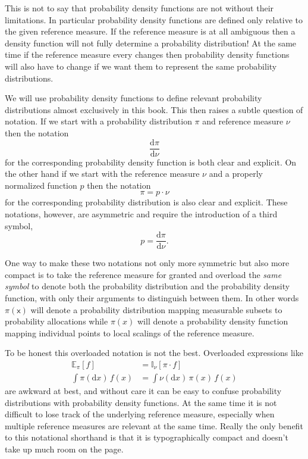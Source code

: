 \documentclass[
  letterpaper,
  DIV=11,
  numbers=noendperiod]{scrartcl}
\begin{document}
This is not to say that probability density functions are not without
their limitations. In particular probability density functions are
defined only relative to the given reference measure. If the reference
measure is at all ambiguous then a density function will not fully
determine a probability distribution! At the same time if the reference
measure every changes then probability density functions will also have
to change if we want them to represent the same probability
distributions.

We will use probability density functions to define relevant probability
distributions almost exclusively in this book. This then raises a subtle
question of notation. If we start with a probability distribution
\(\pi\) and reference measure \(\nu\) then the notation \[
\frac{ \mathrm{d} \pi}{ \mathrm{d} \nu}
\] for the corresponding probability density function is both clear and
explicit. On the other hand if we start with the reference measure
\(\nu\) and a properly normalized function \(p\) then the notation \[
\pi = p \cdot \nu
\] for the corresponding probability distribution is also clear and
explicit. These notations, however, are asymmetric and require the
introduction of a third symbol, \[
p = \frac{ \mathrm{d} \pi}{ \mathrm{d} \nu}.
\]

One way to make these two notations not only more symmetric but also
more compact is to take the reference measure for granted and overload
the \emph{same symbol} to denote both the probability distribution and
the probability density function, with only their arguments to
distinguish between them. In other words \(\pi(\mathsf{x})\) will denote
a probability distribution mapping measurable subsets to probability
allocations while \(\pi(x)\) will denote a probability density function
mapping individual points to local scalings of the reference measure.

To be honest this overloaded notation is not the best. Overloaded
expressions like \begin{align*}
\mathbb{E}_{\pi}[f]
&=
\mathbb{I}_{\nu} \left[ \pi \cdot f \right]
\\
\int \pi(\mathrm{d}x) \, f(x)
&=
\int \nu(\mathrm{d}x) \, \pi(x) \, f(x)
\end{align*} are awkward at best, and without care it can be easy to
confuse probability distributions with probability density functions. At
the same time it is not difficult to lose track of the underlying
reference measure, especially when multiple reference measures are
relevant at the same time. Really the only benefit to this notational
shorthand is that it is typographically compact and doesn't take up much
room on the page.
\end{document}
